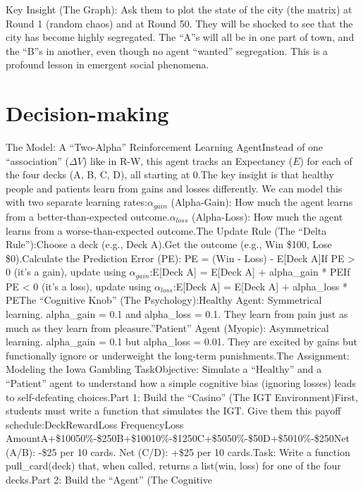 \documentclass[
]{article}
\begin{document}
Key Insight (The Graph): Ask them to plot the state of the city (the
matrix) at Round 1 (random chaos) and at Round 50. They will be shocked
to see that the city has become highly segregated. The ``A''s will all
be in one part of town, and the ``B''s in another, even though no agent
``wanted'' segregation. This is a profound lesson in emergent social
phenomena.

\section{Decision-making}\label{decision-making}

The Model: A ``Two-Alpha'' Reinforcement Learning AgentInstead of one
``association'' (\(\Delta V\)) like in R-W, this agent tracks an
Expectancy (\(E\)) for each of the four decks (A, B, C, D), all starting
at 0.The key insight is that healthy people and patients learn from
gains and losses differently. We can model this with two separate
learning rates:\(\alpha_{gain}\) (Alpha-Gain): How much the agent learns
from a better-than-expected outcome.\(\alpha_{loss}\) (Alpha-Loss): How
much the agent learns from a worse-than-expected outcome.The Update Rule
(The ``Delta Rule''):Choose a deck (e.g., Deck A).Get the outcome (e.g.,
Win \$100, Lose \$0).Calculate the Prediction Error (PE): PE = (Win -
Loss) - E{[}Deck A{]}If PE \textgreater{} 0 (it's a gain), update using
\(\alpha_{gain}\):E{[}Deck A{]} = E{[}Deck A{]} + alpha\_gain * PEIf PE
\textless{} 0 (it's a loss), update using \(\alpha_{loss}\):E{[}Deck
A{]} = E{[}Deck A{]} + alpha\_loss * PEThe ``Cognitive Knob'' (The
Psychology):Healthy Agent: Symmetrical learning. alpha\_gain = 0.1 and
alpha\_loss = 0.1. They learn from pain just as much as they learn from
pleasure.''Patient'' Agent (Myopic): Asymmetrical learning. alpha\_gain
= 0.1 but alpha\_loss = 0.01. They are excited by gains but functionally
ignore or underweight the long-term punishments.The Assignment: Modeling
the Iowa Gambling TaskObjective: Simulate a ``Healthy'' and a
``Patient'' agent to understand how a simple cognitive bias (ignoring
losses) leads to self-defeating choices.Part 1: Build the ``Casino''
(The IGT Environment)First, students must write a function that
simulates the IGT. Give them this payoff schedule:DeckRewardLoss
FrequencyLoss
AmountA+\$10050\%-\$250B+\$10010\%-\$1250C+\$5050\%-\$50D+\$5010\%-\$250Net
(A/B): -\$25 per 10 cards. Net (C/D): +\$25 per 10 cards.Task: Write a
function pull\_card(deck) that, when called, returns a list(win, loss)
for one of the four decks.Part 2: Build the ``Agent'' (The Cognitive
\end{document}
